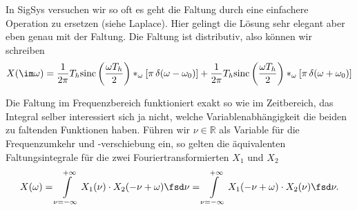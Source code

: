 \begin{ExCalc}
In SigSys versuchen wir so oft es geht die Faltung durch eine einfachere Operation
zu ersetzen (siehe Laplace).
Hier gelingt die Lösung sehr elegant aber eben genau mit der Faltung.
Die Faltung ist distributiv, also können wir schreiben
\begin{align}
X(\im\omega) = \frac{1}{2\pi}
T_h \mathrm{sinc}\left(\frac{\omega T_h}{2}\right) \ast_\omega
[\pi \, \delta(\omega-\omega_0)]
+
\frac{1}{2\pi}
T_h \mathrm{sinc}\left(\frac{\omega T_h}{2}\right) \ast_\omega
[\pi \, \delta(\omega+\omega_0)]
\end{align}

Die Faltung im Frequenzbereich funktioniert exakt so wie im Zeitbereich, das
Integral selber interessiert sich ja nicht, welche Variablenabhängigkeit die
beiden zu faltenden Funktionen haben.
Führen wir $\nu\in\mathbb{R}$ als Variable für die Frequenzumkehr und
-verschiebung ein, so
gelten die äquivalenten Faltungsintegrale für die zwei Fouriertransformierten
$X_1$ und $X_2$
\begin{equation}
X(\omega)  =
\int\limits_{\nu=-\infty}^{+\infty} X_1(\nu) \cdot X_2(-\nu+\omega) \fsd \nu
=
\int\limits_{\nu=-\infty}^{+\infty} X_1(-\nu+\omega) \cdot X_2(\nu) \fsd \nu.
\end{equation}


\end{ExCalc}
